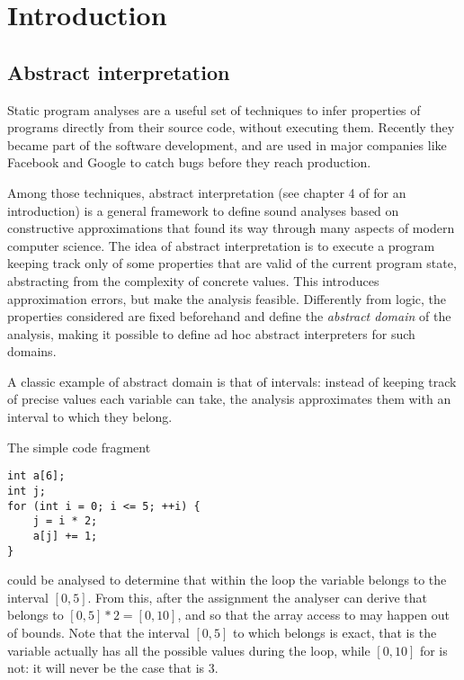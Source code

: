 \chapter{Introduction}\label{ch:intro}
\setcounter{page}{1}
\section{Abstract interpretation}
Static program analyses are a useful set of techniques to infer properties of programs directly from their source code, without executing them. Recently they became part of the software development, and are used in major companies like Facebook \cite{distefano-static-analysis-fb} and Google \cite{static-analysis-google} to catch bugs before they reach production.

Among those techniques, abstract interpretation \cite{cousot-77,cousot-79,cousot-92} (see chapter 4 of \cite{principles-of-program-analysis-book} for an introduction) is a general framework to define sound analyses based on constructive approximations that found its way through many aspects of modern computer science.
The idea of abstract interpretation is to execute a program keeping track only of some properties that are valid of the current program state, abstracting from the complexity of concrete values. This introduces approximation errors, but make the analysis feasible. Differently from logic, the properties considered are fixed beforehand and define the \textit{abstract domain} of the analysis, making it possible to define ad hoc abstract interpreters for such domains.

\begin{example}[Intervals]\label{intr:ex:intervals}
	A classic example of abstract domain is that of intervals: instead of keeping track of precise values each variable can take, the analysis approximates them with an interval to which they belong.

	The simple code fragment
	\begin{verbatim}
int a[6];
int j;
for (int i = 0; i <= 5; ++i) {
	j = i * 2;
	a[j] += 1;
}
	\end{verbatim}
	could be analysed to determine that within the loop the variable  belongs to the interval $[0, 5]$. From this, after the assignment  the analyser can derive that  belongs to $[0, 5] * 2 = [0, 10]$, and so that the array access to  may happen out of bounds.
	Note that the interval $[0, 5]$ to which  belongs is exact, that is the variable actually has all the possible values during the loop, while $[0, 10]$ for  is not: it will never be the case that  is $3$.
\end{example}

